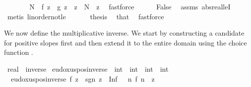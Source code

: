 \begin{isabellebody}
\ \ \ \ \isamarkupfalse%
\ \isamarkupfalse%
\ N\ \ {\isachardoublequoteopen}f\ z\ {\isasymle}\ g\ z{\isachardoublequoteclose}\ \ {\isachardoublequoteopen}z\ {\isasymge}\ N{\isachardoublequoteclose}\ \ z\ \isamarkupfalse%
\ fastforce\isanewline
\ \ \ \ \isamarkupfalse%
\ False\ \isamarkupfalse%
\ assms\ abs{\isacharunderscore}{\kern0pt}real{\isacharunderscore}{\kern0pt}leI\ \isamarkupfalse%
\ {\isacharparenleft}{\kern0pt}metis\ linorder{\isacharunderscore}{\kern0pt}not{\isacharunderscore}{\kern0pt}le{\isacharparenright}{\kern0pt}\isanewline
\ \ \isacommand{{\isacharbraceright}{\kern0pt}}\isamarkupfalse%
\isanewline
\ \ \isamarkupfalse%
\ {\isacharquery}{\kern0pt}thesis\ \isamarkupfalse%
\ that\ \isamarkupfalse%
\ fastforce\isanewline
{}\isamarkupfalse%
%
\endisatagproof
{\isafoldproof}%
%
\isadelimproof
%
\endisadelimproof
%
\isadelimdocument
%
\endisadelimdocument
%
\isatagdocument
%
\isamarkuptrue%
%
\endisatagdocument
{\isafolddocument}%
%
\isadelimdocument
%
\endisadelimdocument
%
\begin{isamarkuptext}%
We now define the multiplicative inverse. We start by constructing a candidate for positive slopes first and then extend it to the entire domain using the choice function .%
\end{isamarkuptext}\isamarkuptrue%
\isamarkupfalse%
\ real\ {\isacharcolon}{\kern0pt}{\isacharcolon}{\kern0pt}\ {\isachardoublequoteopen}{\isacharbraceleft}{\kern0pt}inverse{\isacharbraceright}{\kern0pt}{\isachardoublequoteclose}\isanewline
{}\isanewline
\isanewline
{}\isamarkupfalse%
\ eudoxus{\isacharunderscore}{\kern0pt}pos{\isacharunderscore}{\kern0pt}inverse\ {\isacharcolon}{\kern0pt}{\isacharcolon}{\kern0pt}\ {\isachardoublequoteopen}{\isacharparenleft}{\kern0pt}int\ {\isasymRightarrow}\ int{\isacharparenright}{\kern0pt}\ {\isasymRightarrow}\ {\isacharparenleft}{\kern0pt}int\ {\isasymRightarrow}\ int{\isacharparenright}{\kern0pt}{\isachardoublequoteclose}\ \isanewline
\ \ {\isachardoublequoteopen}eudoxus{\isacharunderscore}{\kern0pt}pos{\isacharunderscore}{\kern0pt}inverse\ f\ z\ {\isacharequal}{\kern0pt}\ sgn\ z\ {\isacharasterisk}{\kern0pt}\ Inf\ {\isacharparenleft}{\kern0pt}{\isacharbraceleft}{\kern0pt}{}{\isachardot}{\kern0pt}{\isachardot}{\kern0pt}{\isacharbraceright}{\kern0pt}\ {\isasyminter}\ {\isacharbraceleft}{\kern0pt}n{\isachardot}{\kern0pt}\ f\ n\ {\isasymge}\ {\isasymbar}z{\isasymbar}{\isacharbraceright}{\kern0pt}{\isacharparenright}{\kern0pt}{\isachardoublequoteclose}\isanewline

\end{isabellebody}
